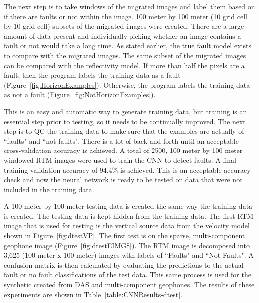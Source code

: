 The next step is to take windows of the migrated images and label them based on if there are faults or not within the image. 100 meter by 100 meter (10 grid cell by 10 grid cell) subsets of the migrated images were created. There are a large amount of data present and individually picking whether an image contains a fault or not would take a long time. As stated earlier, the true fault model exists to compare with the migrated images. The same subset of the migrated images can be compared with the reflectivity model. If more than half the pixels are a fault, then the program labels the training data as a fault (Figure~\ref{fig:HorizonExamples}). Otherwise, the program labels the training data as not a fault (Figure~\ref{fig:NotHorizonExamples}).


This is an easy and automatic way to generate training data, but training is an essential step prior to testing, so it needs to be continually improved. The next step is to QC the training data to make sure that the examples are actually of ``faults" and ``not faults". There is a lot of back and forth until an acceptable cross-validation accuracy is achieved. A total of 2500, 100 meter by 100 meter windowed RTM images were used to train the CNN to detect faults. A final training validation accuracy of 94.4\% is achieved. This is an acceptable accuracy check and now the neural network is ready to be tested on data that were not included in the training data.

A 100 meter by 100 meter testing data is created the same way the training data is created. The testing data is kept hidden from the training data. The first RTM image that is used for testing is the vertical source data from the velocity model shown in Figure~\ref{fig:dtestVP}. The first test is on the sparse, multi-component geophone image (Figure~\ref{fig:dtestEIMGS}). The RTM image is decomposed into 3,625 (100 meter x 100 meter) images with labels of ``Faults" and ``Not Faults". A confusion matrix is then calculated by evaluating the predictions to the actual fault or no fault classifications of the test data. This same process is used for the synthetic created from DAS and multi-component geophones. The results of these experiments are shown in Table~\ref{table:CNNResults-dtest}.

